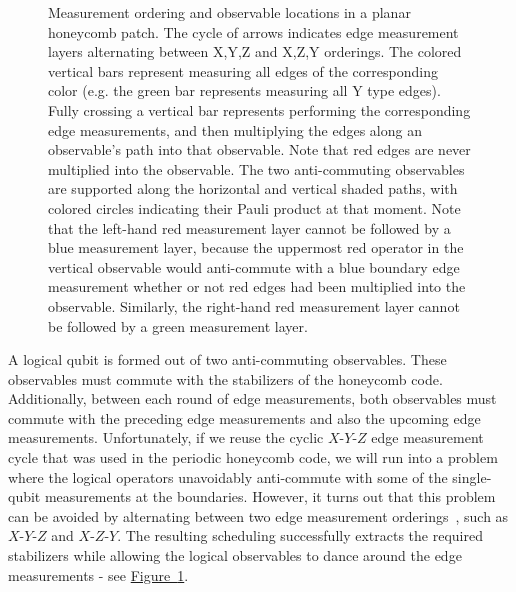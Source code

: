 \documentclass[onecolumn,a4paper,accepted=2022-09-12]{quantumarticle}
\theoremstyle{definition}
\theoremstyle{definition}
\theoremstyle{definition}
\newcommand{\fig}[1]{\hyperref[fig:#1]{Figure~\ref*{fig:#1}}}
\begin{document}
\begin{figure}[ht!]
    \centering
    \caption{
    Measurement ordering and observable locations in a planar honeycomb patch.
    The cycle of arrows indicates edge measurement layers alternating between X,Y,Z and X,Z,Y orderings.
    The colored vertical bars represent measuring all edges of the corresponding color (e.g. the green bar represents measuring all Y type edges).
    Fully crossing a vertical bar represents performing the corresponding edge measurements, and then multiplying the edges along an observable's path into that observable.  
    Note that red edges are never multiplied into the observable.
    The two anti-commuting observables are supported along the horizontal and vertical shaded paths, with colored circles indicating their Pauli product at that moment. 
    Note that the left-hand red measurement layer cannot be followed by a blue measurement layer, because the uppermost red operator in the vertical observable would anti-commute with a blue boundary edge measurement whether or not red edges had been multiplied into the observable.
    Similarly, the right-hand red measurement layer cannot be followed by a green measurement layer.
    }
    \label{fig:two_round_cycle}
\end{figure}

A logical qubit is formed out of two anti-commuting observables.
These observables must commute with the stabilizers of the honeycomb code.
Additionally, between each round of edge measurements, both observables must commute with the preceding edge measurements and also the upcoming edge measurements.
Unfortunately, if we reuse the cyclic $X$-$Y$-$Z$ edge measurement cycle that was used in the periodic honeycomb code, we will run into a problem where the logical operators unavoidably anti-commute with some of the single-qubit measurements at the boundaries.
However, it turns out that this problem can be avoided by alternating between two edge measurement orderings~\cite{hastings2021dynamically}, such as $X$-$Y$-$Z$ and $X$-$Z$-$Y$.
The resulting scheduling successfully extracts the required stabilizers while allowing the logical observables to dance around the edge measurements - see \fig{two_round_cycle}.
\end{document}

